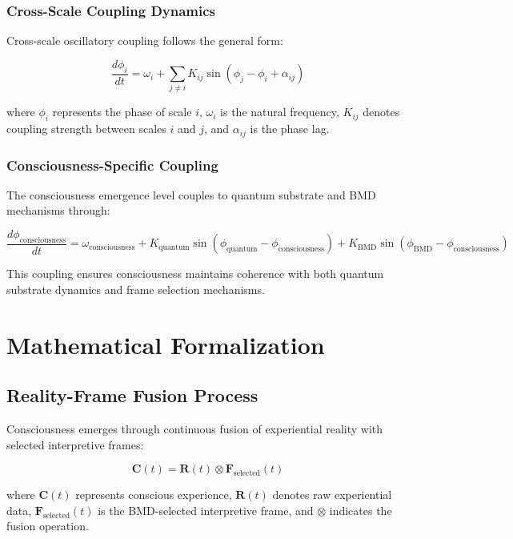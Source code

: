\documentclass[12pt,a4paper]{article}
\begin{document}
\subsubsection{Cross-Scale Coupling Dynamics}

Cross-scale oscillatory coupling follows the general form:

\begin{equation}
\frac{d\phi_i}{dt} = \omega_i + \sum_{j \neq i} K_{ij} \sin(\phi_j - \phi_i + \alpha_{ij})
\end{equation}

where $\phi_i$ represents the phase of scale $i$, $\omega_i$ is the natural frequency, $K_{ij}$ denotes coupling strength between scales $i$ and $j$, and $\alpha_{ij}$ is the phase lag.

\subsubsection{Consciousness-Specific Coupling}

The consciousness emergence level couples to quantum substrate and BMD mechanisms through:

\begin{equation}
\frac{d\phi_{\text{consciousness}}}{dt} = \omega_{\text{consciousness}} + K_{\text{quantum}} \sin(\phi_{\text{quantum}} - \phi_{\text{consciousness}}) + K_{\text{BMD}} \sin(\phi_{\text{BMD}} - \phi_{\text{consciousness}})
\end{equation}

This coupling ensures consciousness maintains coherence with both quantum substrate dynamics and frame selection mechanisms.

\section{Mathematical Formalization}

\subsection{Reality-Frame Fusion Process}

Consciousness emerges through continuous fusion of experiential reality with selected interpretive frames:

\begin{equation}
\mathbf{C}(t) = \mathbf{R}(t) \otimes \mathbf{F}_{\text{selected}}(t)
\end{equation}

where $\mathbf{C}(t)$ represents conscious experience, $\mathbf{R}(t)$ denotes raw experiential data, $\mathbf{F}_{\text{selected}}(t)$ is the BMD-selected interpretive frame, and $\otimes$ indicates the fusion operation.
\end{document}
